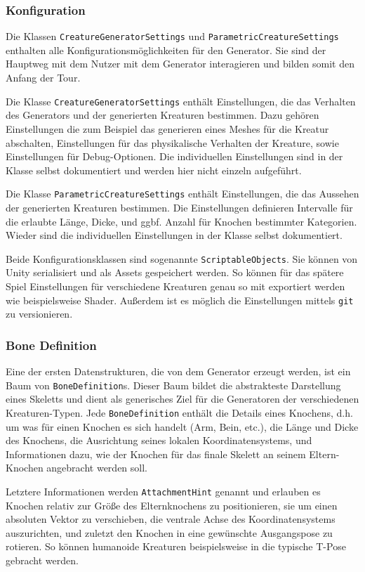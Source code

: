 \subsubsection{Konfiguration}
Die Klassen \texttt{Creature\-Generator\-Settings} und \texttt{Parametric\-Creature\-Settings} enthalten alle Konfigurationsmöglichkeiten für den Generator.
Sie sind der Hauptweg mit dem Nutzer mit dem Generator interagieren und bilden somit den Anfang der Tour. 

Die Klasse \texttt{CreatureGeneratorSettings} enthält Einstellungen, die das Verhalten des Generators und der generierten Kreaturen bestimmen.
Dazu gehören Einstellungen die zum Beispiel das generieren eines Meshes für die Kreatur abschalten, Einstellungen für das physikalische Verhalten der Kreature, sowie Einstellungen für Debug-Optionen.
Die individuellen Einstellungen sind in der Klasse selbst dokumentiert und werden hier nicht einzeln aufgeführt.

Die Klasse \texttt{ParametricCreatureSettings} enthält Einstellungen, die das Aussehen der generierten Kreaturen bestimmen.
Die Einstellungen definieren Intervalle für die erlaubte Länge, Dicke, und ggbf. Anzahl für Knochen bestimmter Kategorien.
Wieder sind die individuellen Einstellungen in der Klasse selbst dokumentiert.

Beide Konfigurationsklassen sind sogenannte \texttt{ScriptableObjects}.
Sie können von Unity serialisiert und als Assets gespeichert werden.
So können für das spätere Spiel Einstellungen für verschiedene Kreaturen genau so mit exportiert werden wie beispielsweise Shader.
Außerdem ist es möglich die Einstellungen mittels \texttt{git} zu versionieren.

\subsubsection{Bone Definition}
Eine der ersten Datenstrukturen, die von dem Generator erzeugt werden, ist ein Baum von \texttt{BoneDefinition}s.
Dieser Baum bildet die abstrakteste Darstellung eines Skeletts und dient als generisches Ziel für die Generatoren der verschiedenen Kreaturen-Typen.
Jede \texttt{BoneDefinition} enthält die Details eines Knochens, d.h. um was für einen Knochen es sich handelt (Arm, Bein, etc.), die Länge und Dicke des Knochens, die Ausrichtung seines lokalen Koordinatensystems, und Informationen dazu, wie der Knochen für das finale Skelett an seinem Eltern-Knochen angebracht werden soll.

Letztere Informationen werden \texttt{AttachmentHint} genannt und erlauben es Knochen relativ zur Größe des Elternknochens zu positionieren, sie um einen absoluten Vektor zu verschieben, die ventrale Achse des Koordinatensystems auszurichten, und zuletzt den Knochen in eine gewünschte Ausgangspose zu rotieren.
So können humanoide Kreaturen beispielsweise in die typische T-Pose gebracht werden.


